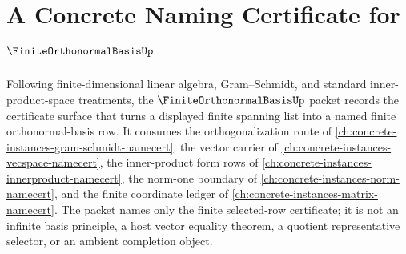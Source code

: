 \chapter{A Concrete Naming Certificate for $\FiniteOrthonormalBasisUp$}
\label{ch:concrete-instances-finite-orthonormal-basis-namecert}

Following finite-dimensional linear algebra, Gram--Schmidt, and standard inner-product-space treatments, the $\FiniteOrthonormalBasisUp$ packet records the certificate surface that turns a displayed finite spanning list into a named finite orthonormal-basis row. It consumes the orthogonalization route of \autoref{ch:concrete-instances-gram-schmidt-namecert}, the vector carrier of \autoref{ch:concrete-instances-vecspace-namecert}, the inner-product form rows of \autoref{ch:concrete-instances-innerproduct-namecert}, the norm-one boundary of \autoref{ch:concrete-instances-norm-namecert}, and the finite coordinate ledger of \autoref{ch:concrete-instances-matrix-namecert}. The packet names only the finite selected-row certificate; it is not an infinite basis principle, a host vector equality theorem, a quotient representative selector, or an ambient completion object.

